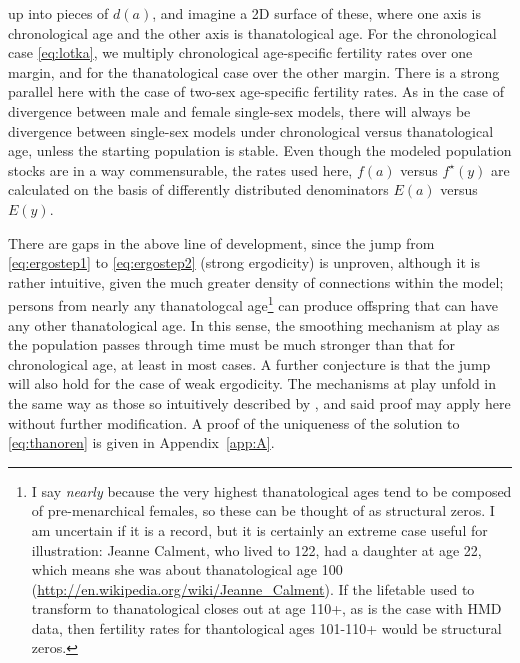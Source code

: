 \documentclass{article}
\begin{document}
up into pieces of $d(a)$, and imagine a 2D surface of these, where one axis is chronological age and the
other axis is thanatological age. For the chronological case \eqref{eq:lotka},
we multiply chronological age-specific fertility rates over one margin, and for
the thanatological case over the other margin. There is a strong parallel here
with the case of two-sex age-specific fertility rates. As in the case of
divergence between male and female single-sex models, there will always be divergence between
single-sex models under chronological versus thanatological age, unless the
starting population is stable. Even though the modeled population stocks are in
a way commensurable, the rates used here, $f(a)$ versus $f^\star(y)$ are
calculated on the basis of differently distributed denominators $E(a)$ versus $E(y)$.

There are gaps in the above line of development, since the jump from
\eqref{eq:ergostep1} to \eqref{eq:ergostep2} (strong ergodicity) is unproven,
although it is rather intuitive, given the much greater density of connections
within the model; persons from nearly any thanatologcal age\footnote{I say
\textit{nearly} because the very highest thanatological ages tend to be
composed of pre-menarchical females, so these can be thought of as structural
zeros. I am uncertain if it is a record, but it is certainly an extreme case
useful for illustration: Jeanne Calment, who lived to 122, had a daughter at age
22, which means she was about thanatological age 100
(\url{http://en.wikipedia.org/wiki/Jeanne_Calment}). If the lifetable used to
transform to thanatological closes out at age 110+, as is the case with HMD data, then fertility rates for thantological ages 101-110+ would be structural
zeros.} can produce offspring that can have any other thanatological age. In
this sense, the smoothing mechanism at play as the population passes through
time must be much stronger than that for chronological age, at least in most
cases. A further conjecture is that the jump will also hold for the case of weak ergodicity. The mechanisms at play unfold in the same way as those so intuitively described by \citet{arthur1982ergodic}, and said proof may apply here without further modification. A proof of the uniqueness of the solution to \eqref{eq:thanoren} is given in Appendix~\ref{app:A}.
\end{document}
